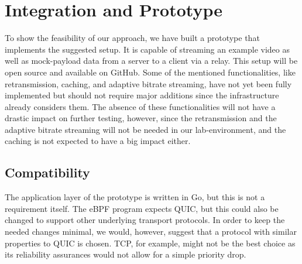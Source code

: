 \section{Integration and Prototype}\label{sec:integration_and_prototype}

To show the feasibility of our approach, we have built a prototype 
that implements the suggested setup.
It is capable of streaming an example video as well as mock-payload data from 
a server to a client via a relay.
This setup will be open source and available on GitHub.
Some of the mentioned functionalities, like retransmission, caching, and adaptive
bitrate streaming, have not yet been fully implemented but should not require major
additions since the infrastructure already considers them.
The absence of these functionalities will not have a drastic impact on further 
testing, however, since the retransmission and the adaptive bitrate streaming will not
be needed in our lab-environment, and the caching is not expected to have a big impact
either.

\subsection{Compatibility}
The application layer of the prototype is written in Go, but this is not a requirement
itself.
The eBPF program expects QUIC, but this could also be changed to support other underlying 
transport protocols.
In order to keep the needed changes minimal, we would, however, suggest that a protocol
with similar properties to QUIC is chosen.
TCP, for example, might not be the best choice as its reliability assurances would not 
allow for a simple priority drop.


